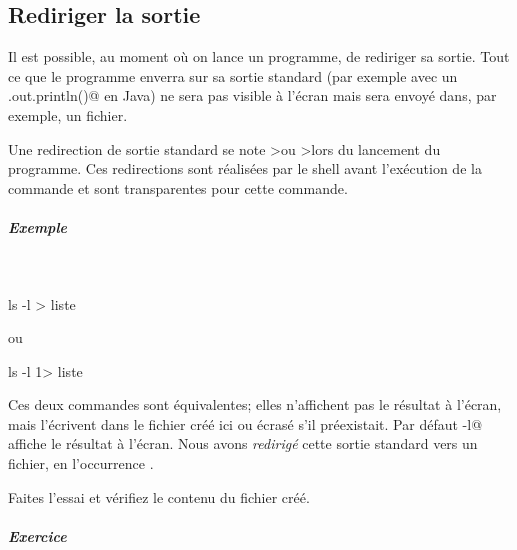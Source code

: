 \documentclass[11pt,a4paper]{article}
\begin{document}
            \par
        \subsection{Rediriger la sortie}
					Il est possible,
					au moment o\`u on lance un programme,
					de rediriger sa sortie.
					Tout ce que le programme enverra
					sur sa sortie standard
					(par exemple avec un
					\verb@System.out.println()@
					en Java) ne sera pas visible \`a l'\'ecran
					mais sera envoy\'e dans, par exemple, un fichier.
				
            \par
        
			\begin{boxedminipage}[h]{\linewidth}
		
					Une redirection de sortie standard se note 
					\guillemotleft >\guillemotright  ou >\guillemotright  lors du lancement du programme.
					Ces redirections sont r\'ealis\'ees par le shell avant 
					l'ex\'ecution de la commande 
					et sont transparentes pour cette commande.
				
			\end{boxedminipage}

			
		\subparagraph{Exemple} 
		
					\textcolor{white}{.} \par
				
            \par
        \begin{Java}
ls -l > liste
\end{Java}
					ou
				\begin{Java}
ls -l 1> liste
\end{Java}
					Ces deux commandes sont \'equivalentes;
					elles n'affichent pas le r\'esultat \`a l'\'ecran,
					mais l'\'ecrivent dans le fichier 
					\verb@liste@ cr\'e\'e ici ou \'ecras\'e 
					s'il pr\'eexistait.
					Par d\'efaut \verb@ls -l@ 
					affiche le r\'esultat \`a l'\'ecran.
					Nous avons \textit{redirig\'e} 
					cette sortie standard vers un fichier, 
					en l'occurrence \verb@liste@.
				
            \par
        
					Faites l'essai et v\'erifiez le contenu du fichier cr\'e\'e.
				
            \par
        
			
		\subparagraph{Exercice} 
		
\end{document}
